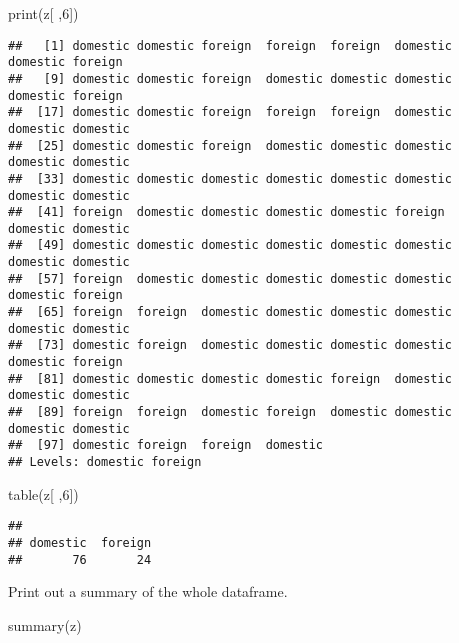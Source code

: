 \documentclass[
]{article}
\newenvironment{Shaded}{\begin{snugshade}}{\end{snugshade}}
\newcommand{\DecValTok}[1]{\textcolor[rgb]{0.00,0.00,0.81}{#1}}
\newcommand{\FunctionTok}[1]{\textcolor[rgb]{0.00,0.00,0.00}{#1}}
\newcommand{\NormalTok}[1]{#1}
\begin{document}
\begin{Shaded}
\begin{Highlighting}[]
\FunctionTok{print}\NormalTok{(z[ ,}\DecValTok{6}\NormalTok{])}
\end{Highlighting}
\end{Shaded}

\begin{verbatim}
##   [1] domestic domestic foreign  foreign  foreign  domestic domestic foreign 
##   [9] domestic domestic foreign  domestic domestic domestic domestic foreign 
##  [17] domestic domestic foreign  foreign  foreign  domestic domestic domestic
##  [25] domestic domestic foreign  domestic domestic domestic domestic domestic
##  [33] domestic domestic domestic domestic domestic domestic domestic domestic
##  [41] foreign  domestic domestic domestic domestic foreign  domestic domestic
##  [49] domestic domestic domestic domestic domestic domestic domestic domestic
##  [57] foreign  domestic domestic domestic domestic domestic domestic foreign 
##  [65] foreign  foreign  domestic domestic domestic domestic domestic domestic
##  [73] domestic foreign  domestic domestic domestic domestic domestic foreign 
##  [81] domestic domestic domestic domestic foreign  domestic domestic domestic
##  [89] foreign  foreign  domestic foreign  domestic domestic domestic domestic
##  [97] domestic foreign  foreign  domestic
## Levels: domestic foreign
\end{verbatim}

\begin{Shaded}
\begin{Highlighting}[]
\FunctionTok{table}\NormalTok{(z[ ,}\DecValTok{6}\NormalTok{])}
\end{Highlighting}
\end{Shaded}

\begin{verbatim}
## 
## domestic  foreign 
##       76       24
\end{verbatim}

Print out a summary of the whole dataframe.

\begin{Shaded}
\begin{Highlighting}[]
\FunctionTok{summary}\NormalTok{(z)}
\end{Highlighting}
\end{Shaded}
\end{document}
